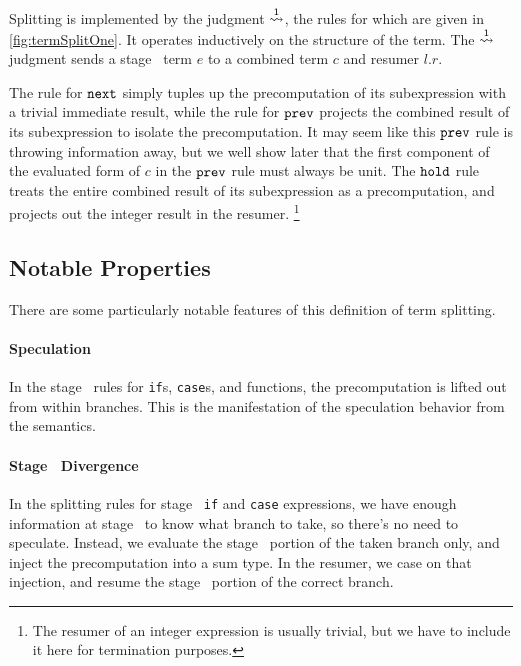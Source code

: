 Splitting is implemented by the judgment $\overset{ 1}\rightsquigarrow$,
the rules for which are given in \cref{fig:termSplitOne}.  
It operates inductively on the structure of the term.  
The $\overset{ 1}\rightsquigarrow$ judgment sends a stage \bbone\ term $e$ to a combined term
$c$ and resumer $l.r$. 

The rule for ${\tt next}$ simply tuples up the precomputation of its subexpression with a trivial immediate result,
while the rule for ${\tt prev}$ projects the combined result of its subexpression to isolate the precomputation.
It may seem like this ${\tt prev}$ rule is throwing information away, but we well show later that the first component 
of the evaluated form of $c$ in the ${\tt prev}$ rule must always be unit.
The ${\tt hold}$ rule treats the entire combined result of its subexpression as a precomputation, 
and projects out the integer result in the resumer.%
\footnote{The resumer of an integer expression is usually trivial, 
but we have to include it here for termination purposes.}

\subsection {Notable Properties}


There are some particularly notable features of this definition of term
splitting.

\paragraph {Speculation}

In the stage \bbtwo\ rules for {\tt if}s, {\tt case}s, and functions, the
precomputation is lifted out from within branches. This is the manifestation of
the speculation behavior from the semantics.

\paragraph {Stage \bbone\ Divergence}

In the splitting rules for stage \bbone\ {\tt if} and {\tt case} expressions, we
have enough information at stage \bbone\ to know what branch to take, so there's
no need to speculate. Instead, we evaluate the stage \bbone\ portion of the
taken branch only, and inject the precomputation into a sum type. In the
resumer, we case on that injection, and resume the stage \bbtwo\ portion of the
correct branch.

